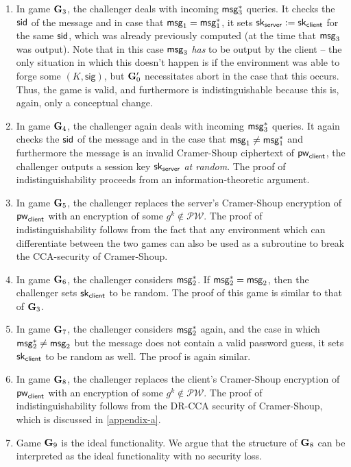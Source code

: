 \begin{enumerate}
	\item In game $\mathbf{G}_3$, the challenger deals with incoming $\mathsf{msg}_{3}^{*}$ queries. It checks the $\mathsf{sid}$ of the message and in case that $\mathsf{msg}_{1} = \mathsf{msg}_{1}^{*}$, it sets $\mathsf{sk}_{\mathsf{server}}:=\mathsf{sk}_{\mathsf{client}}$ for the same $\mathsf{sid}$, which was already previously computed (at the time that $\mathsf{msg}_{3}$ was output).  Note that in this case $\mathsf{msg}_{3}$ \textit{has} to be output by the client -- the only situation in which this doesn't happen is if the environment was able to forge some $(K,\mathsf{sig})$, but $\mathbf{G}_0'$ necessitates abort in the case that this occurs. Thus, the game is valid, and furthermore is indistinguishable because this is, again, only a conceptual change.
	
	\item In game $\mathbf{G}_4$, the challenger again deals with incoming $\mathsf{msg}_{3}^{*}$ queries. It again checks the $\mathsf{sid}$ of the message and in the case that $\mathsf{msg}_{1}\neq\mathsf{msg}_{1}^{*}$ and furthermore the message is an invalid Cramer-Shoup ciphertext of $\mathsf{pw}_{\mathsf{client}}$, the challenger outputs a session key $\mathsf{sk}_{\mathsf{server}}$ \textit{at random}. The proof of indistinguishability proceeds from an information-theoretic argument.
	
	\item In game $\mathbf{G}_5$, the challenger replaces the server's Cramer-Shoup encryption of $\mathsf{pw}_{\mathsf{client}}$ with an encryption of some $g^k\notin\mathcal{PW}$. The proof of indistinguishability follows from the fact that any environment which can differentiate between the two games can also be used as a subroutine to break the CCA-security of Cramer-Shoup.
	
	\item In game $\mathbf{G}_6$, the challenger considers $\mathsf{msg}_{2}^{*}$. If $\mathsf{msg}_{2}^{*}=\mathsf{msg}_{2}$, then the challenger sets $\mathsf{sk}_{\mathsf{client}}$ to be random. The proof of this game is similar to that of $\mathbf{G}_3$.
	
	\item In game $\mathbf{G}_7$, the challenger considers $\mathsf{msg}_{2}^{*}$ again, and the case in which $\mathsf{msg}_{2}^{*}\neq\mathsf{msg}_{2}$ but the message does not contain a valid password guess, it sets $\mathsf{sk}_{\mathsf{client}}$ to be random as well. The proof is again similar.
	
	\item In game $\mathbf{G}_8$, the challenger replaces the client's Cramer-Shoup encryption of $\mathsf{pw}_{\mathsf{client}}$ with an encryption of some $g^k\notin\mathcal{PW}$. The proof of indistinguishability follows from the DR-CCA security of Cramer-Shoup, which is discussed in \cref{appendix-a}.
	
	\item Game $\mathbf{G}_9$ is the ideal functionality. We argue that the structure of $\mathbf{G}_8$ can be interpreted as the ideal functionality with no security loss.	
\end{enumerate} 


